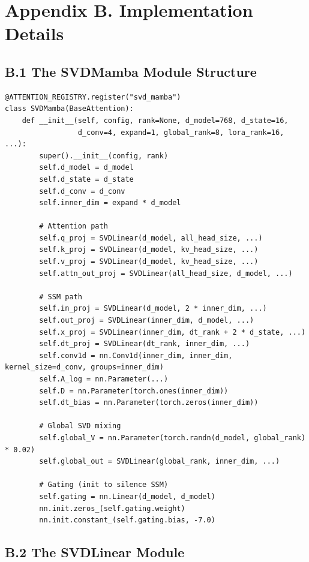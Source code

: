 
\section{Appendix B. Implementation Details}

\subsection{B.1 The SVDMamba Module Structure}

\begin{lstlisting}
@ATTENTION_REGISTRY.register("svd_mamba")
class SVDMamba(BaseAttention):
    def __init__(self, config, rank=None, d_model=768, d_state=16,
                 d_conv=4, expand=1, global_rank=8, lora_rank=16, ...):
        super().__init__(config, rank)
        self.d_model = d_model
        self.d_state = d_state
        self.d_conv = d_conv
        self.inner_dim = expand * d_model
        
        # Attention path
        self.q_proj = SVDLinear(d_model, all_head_size, ...)
        self.k_proj = SVDLinear(d_model, kv_head_size, ...)
        self.v_proj = SVDLinear(d_model, kv_head_size, ...)
        self.attn_out_proj = SVDLinear(all_head_size, d_model, ...)
        
        # SSM path
        self.in_proj = SVDLinear(d_model, 2 * inner_dim, ...)
        self.out_proj = SVDLinear(inner_dim, d_model, ...)
        self.x_proj = SVDLinear(inner_dim, dt_rank + 2 * d_state, ...)
        self.dt_proj = SVDLinear(dt_rank, inner_dim, ...)
        self.conv1d = nn.Conv1d(inner_dim, inner_dim, kernel_size=d_conv, groups=inner_dim)
        self.A_log = nn.Parameter(...)
        self.D = nn.Parameter(torch.ones(inner_dim))
        self.dt_bias = nn.Parameter(torch.zeros(inner_dim))
        
        # Global SVD mixing
        self.global_V = nn.Parameter(torch.randn(d_model, global_rank) * 0.02)
        self.global_out = SVDLinear(global_rank, inner_dim, ...)
        
        # Gating (init to silence SSM)
        self.gating = nn.Linear(d_model, d_model)
        nn.init.zeros_(self.gating.weight)
        nn.init.constant_(self.gating.bias, -7.0)
\end{lstlisting}

\subsection{B.2 The SVDLinear Module}


